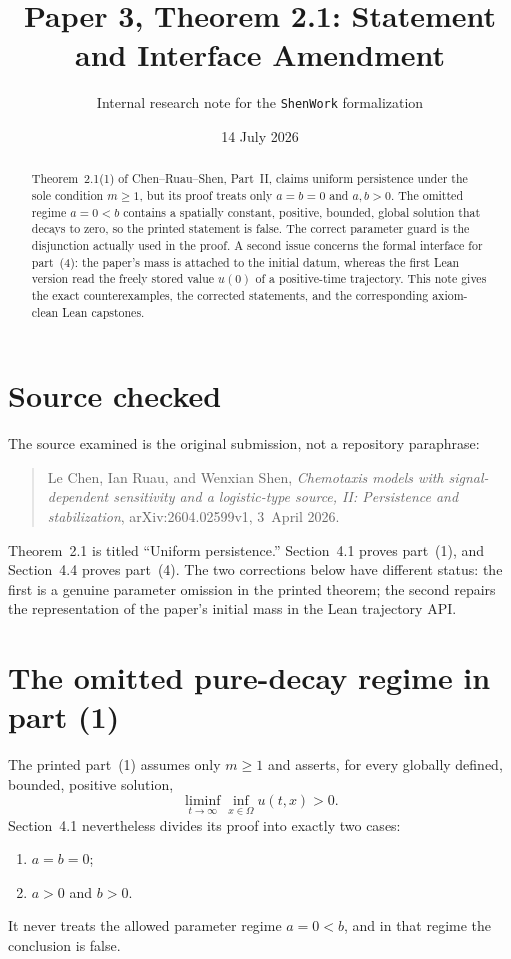 \documentclass[11pt]{article}
\title{Paper 3, Theorem 2.1: Statement and Interface Amendment}
\author{Internal research note for the \texttt{ShenWork} formalization}
\date{14 July 2026}
\newcommand{\Om}{\Omega}
\begin{document}
\maketitle

\begin{abstract}
Theorem~2.1(1) of Chen--Ruau--Shen, Part~II, claims uniform persistence under
the sole condition $m\geq1$, but its proof treats only $a=b=0$ and $a,b>0$.
The omitted regime $a=0<b$ contains a spatially constant, positive, bounded,
global solution that decays to zero, so the printed statement is false.  The
correct parameter guard is the disjunction actually used in the proof.  A
second issue concerns the formal interface for part~(4): the paper's mass is
attached to the initial datum, whereas the first Lean version read the freely
stored value $u(0)$ of a positive-time trajectory.  This note gives the exact
counterexamples, the corrected statements, and the corresponding axiom-clean
Lean capstones.
\end{abstract}

\section{Source checked}

The source examined is the original submission, not a repository paraphrase:
\begin{quote}
Le Chen, Ian Ruau, and Wenxian Shen, \emph{Chemotaxis models with
signal-dependent sensitivity and a logistic-type source, II: Persistence and
stabilization}, arXiv:2604.02599v1, 3~April 2026.
\end{quote}
Theorem~2.1 is titled ``Uniform persistence.''  Section~4.1 proves part~(1),
and Section~4.4 proves part~(4).  The two corrections below have different
status: the first is a genuine parameter omission in the printed theorem; the
second repairs the representation of the paper's initial mass in the Lean
trajectory API.

\section{The omitted pure-decay regime in part (1)}

The printed part~(1) assumes only $m\geq1$ and asserts, for every globally
defined, bounded, positive solution,
\[
  \liminf_{t\to\infty}\inf_{x\in\Om}u(t,x)>0.
\]
Section~4.1 nevertheless divides its proof into exactly two cases:
\begin{enumerate}[label=\arabic*.]
\item $a=b=0$;
\item $a>0$ and $b>0$.
\end{enumerate}
It never treats the allowed parameter regime $a=0<b$, and in that regime the
conclusion is false.
\end{document}
